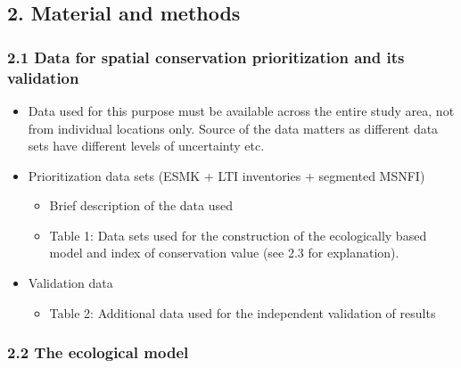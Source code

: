 \documentclass[]{article}
\begin{document}
\subsection{2. Material and methods}

\subsubsection{2.1 Data for spatial conservation prioritization and its
validation}

\begin{itemize}
\itemsep1pt\parskip0pt
\item
  Data used for this purpose must be available across the entire study
  area, not from individual locations only. Source of the data matters
  as different data sets have different levels of uncertainty etc.
\item
  Prioritization data sets (ESMK + LTI inventories + segmented MSNFI)

  \begin{itemize}
  \itemsep1pt\parskip0pt
  \item
    Brief description of the data used
  \item
    Table 1: Data sets used for the construction of the ecologically
    based model and index of conservation value (see 2.3 for
    explanation).
  \end{itemize}
\item
  Validation data

  \begin{itemize}
  \itemsep1pt\parskip0pt
  \item
    Table 2: Additional data used for the independent validation of
    results
  \end{itemize}
\end{itemize}

\subsubsection{2.2 The ecological model}
\end{document}
